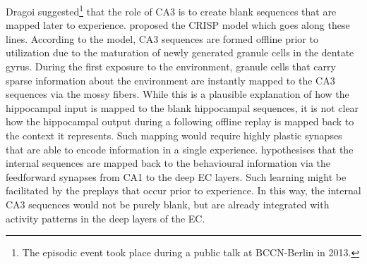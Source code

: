   Dragoi suggested\footnote{The episodic event took place during a public talk
  at BCCN-Berlin in 2013.} that the role of CA3 is to create blank sequences
  that are mapped later to experience. \cite{ChengS2013} proposed the CRISP
  model which goes along these lines. According to the model, CA3 sequences are
  formed offline prior to utilization due to the maturation of newly generated
  granule cells in the dentate gyrus. During the first exposure to the
  environment, granule cells that carry sparse information about the
  environment are instantly mapped to the CA3 sequences via the mossy fibers.
  While this is a plausible explanation of how the hippocampal input is mapped
  to the blank hippocampal sequences, it is not clear how the hippocampal output
  during a following offline replay is mapped back to the context it
  represents. Such mapping would require highly plastic synapses that are able
  to encode information in a single experience. \cite{ChengS2013} hypothesises
  that the internal sequences are mapped back to the behavioural information
  via the feedforward synapses from CA1 to the deep EC layers. Such learning
  might be facilitated by the preplays that occur prior to experience. In this
  way, the internal CA3 sequences would not be purely blank, but are already
  integrated with activity patterns in the deep layers of the EC.




  





